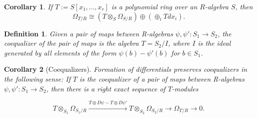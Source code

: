 \documentclass{beamer}
\newtheorem{defn}[prop]{Definition}
\newtheorem{cor}{Corollary}
\begin{document}
\begin{frame}
\begin{small}

\begin{cor}
If $T:=S[x_1,...,x_r]$ is a polynomial ring over an $R$-algebra $S$, then 
$$\Omega_{T/R}\cong (T\otimes_S\Omega_{S/R})\oplus(\oplus_iTdx_i).$$
\end{cor}

\begin{defn}
Given a pair of maps between R-algebras $\psi,\psi':S_1\to S_2$, the coequalizer of the pair of maps is the algebra $T = S_2/I$, where $I$ is the ideal generated by all elements of the form $\psi(b)-\psi'(b)$ for $b\in S_1$.
\end{defn}

\begin{cor}[Coequalizers]
Formation of differentials preserves coequalizers in the following sense: If $T$ is the coequalizer of a pair of maps between R-algebras $\psi,\psi':S_1\to S_2$, then there is a right exact sequence of $T$-modules

$$T\otimes_{S_1}\Omega_{S_1/R}\xrightarrow[\text{}]{T\otimes D\psi - T\otimes D\psi'} T\otimes_{S_2}\Omega_{S_2/R}\to \Omega_{T/R}\to 0.$$

\end{cor}



\end{small}
\end{frame}



\end{document}
